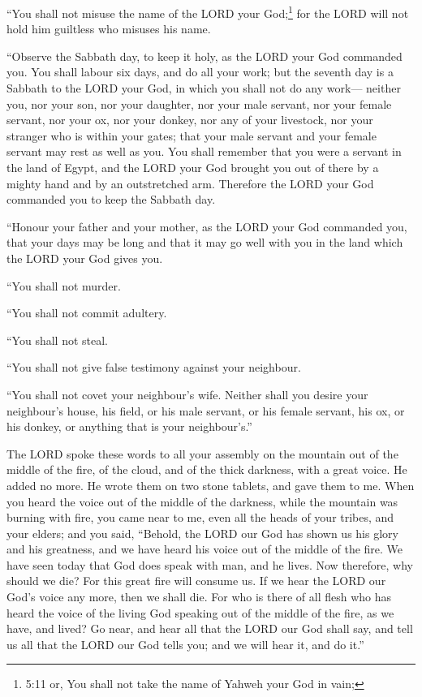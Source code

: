  ``You shall not misuse the name of the LORD your
God;\footnote{5:11 or, You shall not take the name of Yahweh your God in
  vain;} for the LORD will not hold him guiltless who misuses his name.

 ``Observe the Sabbath day, to keep it holy, as the LORD
your God commanded you.  You shall labour six days, and do
all your work;  but the seventh day is a Sabbath to the
LORD your God, in which you shall not do any work--- neither you, nor
your son, nor your daughter, nor your male servant, nor your female
servant, nor your ox, nor your donkey, nor any of your livestock, nor
your stranger who is within your gates; that your male servant and your
female servant may rest as well as you.  You shall remember
that you were a servant in the land of Egypt, and the LORD your God
brought you out of there by a mighty hand and by an outstretched arm.
Therefore the LORD your God commanded you to keep the Sabbath day.

 ``Honour your father and your mother, as the LORD your God
commanded you, that your days may be long and that it may go well with
you in the land which the LORD your God gives you.

 ``You shall not murder.

 ``You shall not commit adultery.

 ``You shall not steal.

 ``You shall not give false testimony against your
neighbour.

 ``You shall not covet your neighbour's wife. Neither shall
you desire your neighbour's house, his field, or his male servant, or
his female servant, his ox, or his donkey, or anything that is your
neighbour's.''

 The LORD spoke these words to all your assembly on the
mountain out of the middle of the fire, of the cloud, and of the thick
darkness, with a great voice. He added no more. He wrote them on two
stone tablets, and gave them to me.  When you heard the
voice out of the middle of the darkness, while the mountain was burning
with fire, you came near to me, even all the heads of your tribes, and
your elders;  and you said, ``Behold, the LORD our God has
shown us his glory and his greatness, and we have heard his voice out of
the middle of the fire. We have seen today that God does speak with man,
and he lives.  Now therefore, why should we die? For this
great fire will consume us. If we hear the LORD our God's voice any
more, then we shall die.  For who is there of all flesh who
has heard the voice of the living God speaking out of the middle of the
fire, as we have, and lived?  Go near, and hear all that
the LORD our God shall say, and tell us all that the LORD our God tells
you; and we will hear it, and do it.''

